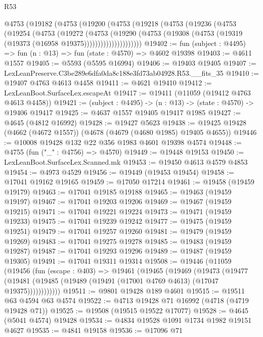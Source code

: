 \begin{lexlean}{R53}
\begin{coremodule}
      @4753
        (@19182
          (@4753
            (@19200
              (@4753
                (@19218
                  (@4753
                    (@19236
                      (@4753
                        (@19254
                          (@4753
                            (@19272
                              (@4753
                                (@19290
                                  (@4753
                                    (@19308
                                      (@4753 (@19319 (@19373 (@16958 @19375)))))))))))))))))))))
@19402 := fun (subject : @4495) => fun (n : @13) => fun (state : @4570) => @4602 @19398
@19403 := @4611 @1557
@19405 := @5593 (@5595 @16994)
@19406 := @19403 @19405
@19407 := LexLeanPreserve.C3be289e6dfa0da8c188e3fd73ab04928.R53.__fits_35
@19410 := @19407 @4763 @4613 @4458
@19411 := @4621 @19410
@19412 := LexLeanBoot.SurfaceLex.escapeAt
@19417 := @19411 (@11059 (@19412 @4763 @4613 @4458))
@19421 := (subject : @4495) -> (n : @13) -> (state : @4570) -> @19406 @19417
@19425 := @4637 @1557 @19405 @19417 @1985
@19427 := @4645 (@4812 @16992)
@19428 := @19427 @5623
@19438 := @19425 @19428 (@4662 (@4672 @1557)) (@4678 (@4679 (@4680 @1985) @19405 @4655))
@19446 := @10008 @19428 @132 @22 @356 @1983 @4601 @19398 @4574
@19448 := @4755 (fun ("_" : @4756) => @4570)
@19449 := @19448 @19153
@19450 := LexLeanBoot.SurfaceLex.Scanned.mk
@19453 := @19450 @4613 @4579 @4853
@19454 := @4973 @4529
@19456 := @19449 (@19453 @19454)
@19458 := @17041 @19162 @19165
@19459 := @17050 @17214
@19461 := @19458 (@19459 @19179)
@19463 := @17041 @19185 @19188
@19465 := @19463 (@19459 @19197)
@19467 := @17041 @19203 @19206
@19469 := @19467 (@19459 @19215)
@19471 := @17041 @19221 @19224
@19473 := @19471 (@19459 @19233)
@19475 := @17041 @19239 @19242
@19477 := @19475 (@19459 @19251)
@19479 := @17041 @19257 @19260
@19481 := @19479 (@19459 @19269)
@19483 := @17041 @19275 @19278
@19485 := @19483 (@19459 @19287)
@19487 := @17041 @19293 @19296
@19489 := @19487 (@19459 @19305)
@19491 := @17041 @19311 @19314
@19508 := @19446
    (@11059
      (@19456
        (fun (escape : @403) =>
        @19461
          (@19465
            (@19469
              (@19473
                (@19477
                  (@19481 (@19485 (@19489 (@19491 (@17001 @4769 @4613) (@17047 @19375))))))))))))
@19511 := @9801 @19428 @189 @4601
@19515 := @19511 @63 @4594 @63 @4574
@19522 := @4713 @19428 @71 @16992 (@4718 (@4719 @19428 @71))
@19525 := @19508 (@19515 @19522 @17077)
@19528 := @4645 (@5041 @4574) @19428
@19534 := @4834 @19528 @1091 @1734 @1982 @19151 @4627
@19535 := @4841 @19158
@19536 := @17096 @71

\end{coremodule}
\end{lexlean}
